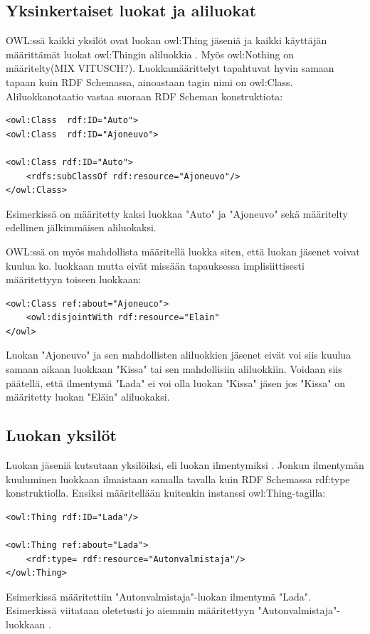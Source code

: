 \documentclass[finnish]{tktltiki2}
\theoremstyle{definition}
\theoremstyle{remark}
\begin{document}
\subsection{Yksinkertaiset luokat ja aliluokat}
OWL:ssä kaikki yksilöt ovat luokan owl:Thing jäseniä ja kaikki käyttäjän määrittämät luokat owl:Thingin aliluokkia \cite{SWM04}. Myös owl:Nothing on määritelty(MIX VITUSCH?). Luokkamäärittelyt tapahtuvat hyvin samaan tapaan kuin RDF Schemassa, ainoastaan tagin nimi on owl:Class. Aliluokkanotaatio vastaa suoraan RDF Scheman konstruktiota:
\begin{verbatim}
<owl:Class  rdf:ID="Auto">
<owl:Class  rdf:ID="Ajoneuvo">

<owl:Class rdf:ID="Auto">
    <rdfs:subClassOf rdf:resource="Ajoneuvo"/>
</owl:Class>
\end{verbatim}
Esimerkissä on määritetty kaksi luokkaa "Auto" ja "Ajoneuvo" sekä määritelty edellinen jälkimmäisen aliluokaksi. 

OWL:ssä on myös mahdollista määritellä luokka siten, että luokan jäsenet voivat kuulua ko. luokkaan mutta eivät missään tapauksessa
implisiittisesti määritettyyn toiseen luokkaan:
\begin{verbatim}
<owl:Class ref:about="Ajoneuco">
    <owl:disjointWith rdf:resource="Elain"
</owl>
\end{verbatim}
Luokan "Ajoneuvo" ja sen mahdollisten aliluokkien jäsenet eivät voi siis kuulua samaan aikaan luokkaan "Kissa" tai sen mahdollisiin aliluokkiin. Voidaan siis päätellä, että ilmentymä "Lada" ei voi olla luokan "Kissa" jäsen jos "Kissa" on määritetty luokan "Eläin" aliluokaksi. 

\subsection{Luokan yksilöt}
Luokan jäseniä kutsutaan yksilöiksi, eli luokan ilmentymiksi \cite{SWM04}. Jonkun ilmentymän kuuluminen luokkaan ilmaistaan samalla tavalla kuin RDF Schemassa rdf:type konstruktiolla. Ensiksi määritellään kuitenkin instanssi owl:Thing-tagilla:
\begin{verbatim}
<owl:Thing rdf:ID="Lada"/>

<owl:Thing ref:about="Lada">
    <rdf:type= rdf:resource="Autonvalmistaja"/>
</owl:Thing>
\end{verbatim}
Esimerkissä määritettiin "Autonvalmistaja"-luokan ilmentymä "Lada". Esimerkissä viitataan oletetusti jo aiemmin määritettyyn "Autonvalmistaja"-luokkaan \cite{SWM04}. 
\end{document}
